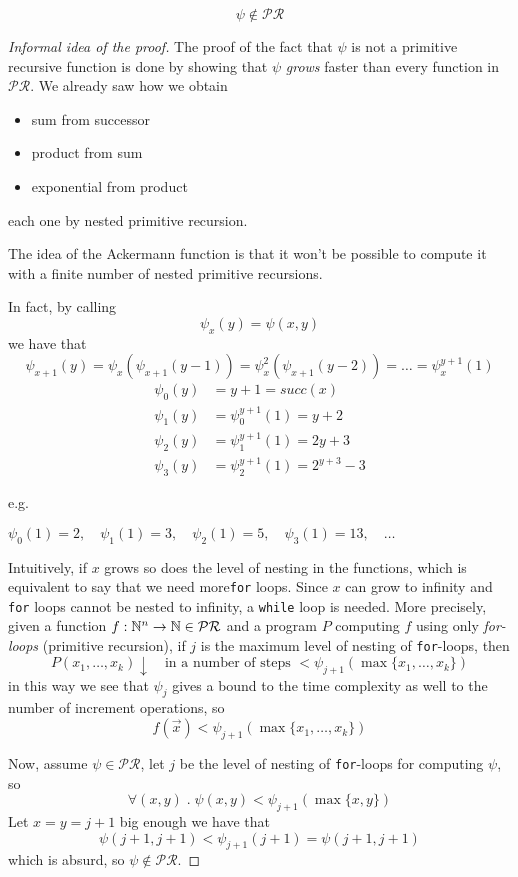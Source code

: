 \begin{theorem}
  \[ \psi \notin \mathcal{PR} \]
  \begin{proof}[Informal idea of the proof]
    The proof of the fact that $\psi$ is not a primitive recursive
    function is done by showing that $\psi$ \emph{grows} faster than
    every function in $\mathcal{PR}$. We already saw how we obtain
    \begin{itemize}
    \item sum from successor
    \item product from sum
    \item exponential from product
    \end{itemize}
    each one by nested primitive recursion.

    The idea of the Ackermann function is that it won't be possible to compute it with a finite number of
    nested primitive recursions.

    In fact, by calling \[\psi_x(y) = \psi(x,y)\] we have
    that
    \[
      \psi_{x+1}(y) = \psi_x(\psi_{x+1}(y-1)) =
      \psi^2_{x}(\psi_{x+1}(y-2)) = \dots = \psi_x^{y+1}(1)
    \]
    \begin{align*}
      \psi_0(y) &= y+1 = succ(x)\\
      \psi_1(y) &= \psi_0^{y+1}(1) = y+2\\
      \psi_2(y) &= \psi_1^{y+1}(1) = 2y+3\\
      \psi_3(y) &= \psi_2^{y+1}(1) = 2^{y+3}-3
    \end{align*}

    e.g.

    \(\psi_0(1) = 2, \quad \psi_1(1) = 3, \quad \psi_2(1) = 5, \quad
    \psi_3(1) = 13, \quad \dots\)

    Intuitively, if $x$ grows so does the level of nesting
    in the functions, which is equivalent to say that we need more\texttt{for} loops. 
    Since $x$ can grow to infinity and
    \texttt{for} loops cannot be nested to infinity, a \texttt{while}
    loop is needed. More precisely, given a
    function $f :\mathbb{N}^n \to \mathbb{N} \in \mathcal{PR}$ and a program $P$ computing $f$ using only
    \emph{for-loops} (primitive recursion),
    if $j$ is the maximum level of nesting of \texttt{for}-loops, then
    \[
      P(x_1, \dots, x_k)\downarrow \quad \text{in a number of steps }
      < \psi_{j+1}(\max\{x_1, \dots, x_k\})
    \]
    in this way we see that $\psi_j$ gives a bound to the time complexity
    as well to the number of increment operations, so
    \[f(\vec{x}) < \psi_{j+1}(\max\{x_1, \dots, x_k\})\]

    Now, assume $\psi \in \mathcal{PR}$, let $j$ be the
    level of nesting of \texttt{for}-loops for computing $\psi$, so 
    \[\forall (x,y)\;.\;\psi(x,y) < \psi_{j+1}(\max\{x,y\})\]
    Let $x=y=j+1$ big enough we have
    that \[\psi(j+1,j+1) < \psi_{j+1}(j+1) = \psi(j+1,j+1)\] which is
    absurd, so $\psi \notin \mathcal{PR}$.
  \end{proof}
\end{theorem}

